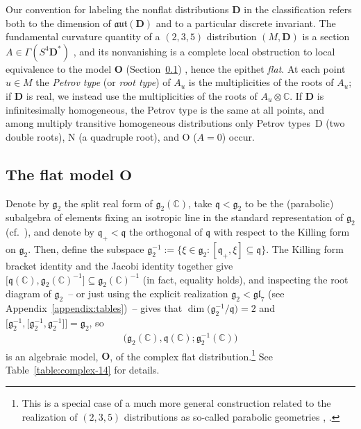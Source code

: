 \documentclass[10pt,a4paper]{amsart}
\newcommand{\bbC}{\mathbb{C}}
\newcommand{\mbD}{\mathbf{D}}
\newcommand{\mbO}{\mathbf{O}}
\newcommand{\mfg} {\mathfrak{g}}
\newcommand{\mfq} {\mathfrak{q}}
\newcommand{\mfaut}{\mathfrak{aut}}
\newcommand{\mfgl} {\mathfrak{gl}}
\numberwithin{equation}{section}
\begin{document}
\begin{Remark}\label{remark:labeling}Our convention for labeling the nonflat distributions $\mbD$ in the classification refers both to the dimension of $\mfaut(\mbD)$ and to a particular discrete invariant. The fundamental curvature quantity of a $(2, 3, 5)$ distribution $(M, \mbD)$ is a section $A \in \Gamma(S^4 \mbD^*)$ \cite[Section~33]{CartanFiveVariables}, and its nonvanishing is a complete local obstruction to local equivalence to the model $\mbO$ (Section~\ref{subsection:O}) \cite[Sections~36--39]{CartanFiveVariables}, hence the epithet \textit{flat}. At each point $u \in M$ the \textit{Petrov type} (or \textit{root type}) of $A_u$ is the multiplicities of the roots of $A_u$; if $\mbD$ is real, we instead use the multiplicities of the roots of $A_u \otimes \bbC$. If $\mbD$ is infinitesimally homogeneous, the Petrov type is the same at all points, and among multiply transitive homogeneous distributions only Petrov types~D (two double roots), N (a quadruple root), and O ($A = 0$) occur.
\end{Remark}

\subsection[The flat model $\mbO$]{The flat model $\boldsymbol{\mbO}$}\label{subsection:O}
Denote by $\mfg_2$ the split real form of $\mfg_2(\bbC)$, take $\mfq < \mfg_2$ to be the (parabolic) subalgebra of elements fixing an isotropic line in the standard representation of $\mfg_2$ (cf.\ \cite[Section~4]{BorMontgomery}), and denote by $\mfq_+ < \mfq$ the orthogonal of $\mfq$ with respect to the Killing form on $\mfg_2$. Then, define the subspace $\mfg_2^{-1} := \{ \xi \in \mfg_2 \colon [\mfq_+ , \xi] \subseteq \mfq \}$. The Killing form bracket identity and the Jacobi identity together give $\big[\mfq(\bbC), \mfg_2(\bbC)^{-1}\big] \subseteq \mfg_2(\bbC)^{-1}$ (in fact, equality holds), and inspecting the root diagram of $\mfg_2$~-- or just using the explicit realization $\mfg_2 < \mfgl_7$ (see Appendix~\ref{appendix:tables})~-- gives that $\dim \big(\mfg_2^{-1} / \mfq\big) = 2$ and $\big[\mfg_2^{-1}, \big[\mfg_2^{-1}, \mfg_2^{-1}\big]\big] = \mfg_2$, so
\begin{gather*}
	\boxed{\big(\mfg_2(\bbC), \mfq(\bbC); \mfg_2^{-1}(\bbC)\big)}
\end{gather*}
is an algebraic model, $\mbO$, of the complex flat distribution.\footnote{This is a special case of a much more general construction \cite[Section~3]{CapSlovak} related to the realization of $(2, 3, 5)$ distributions as so-called parabolic geometries \cite[Section~4.3.2]{CapSlovak}, \cite{Sagerschnig}.} See Table~\ref{table:complex-14} for details.
\end{document}
